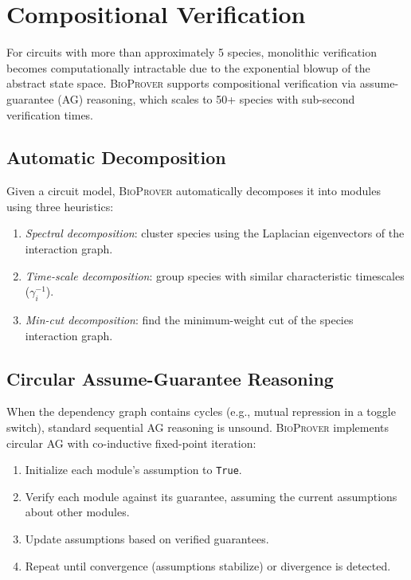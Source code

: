 \documentclass[11pt]{article}
\newcommand{\bioprover}{\textsc{BioProver}}
\begin{document}
\section{Compositional Verification}
\label{sec:compositional}

For circuits with more than approximately 5 species, monolithic
verification becomes computationally intractable due to the
exponential blowup of the abstract state space. \bioprover{} supports
compositional verification via assume-guarantee (AG) reasoning,
which scales to 50+ species with sub-second verification times.

\subsection{Automatic Decomposition}

Given a circuit model, \bioprover{} automatically decomposes it into
modules using three heuristics:
\begin{enumerate}[itemsep=1pt]
\item \emph{Spectral decomposition}: cluster species using the
  Laplacian eigenvectors of the interaction graph.
\item \emph{Time-scale decomposition}: group species with similar
  characteristic timescales ($\gamma_i^{-1}$).
\item \emph{Min-cut decomposition}: find the minimum-weight cut of
  the species interaction graph.
\end{enumerate}

\subsection{Circular Assume-Guarantee Reasoning}

When the dependency graph contains cycles (e.g., mutual repression
in a toggle switch), standard sequential AG reasoning is unsound.
\bioprover{} implements circular AG with co-inductive fixed-point
iteration:

\begin{enumerate}[itemsep=1pt]
\item Initialize each module's assumption to \texttt{True}.
\item Verify each module against its guarantee, assuming the current
  assumptions about other modules.
\item Update assumptions based on verified guarantees.
\item Repeat until convergence (assumptions stabilize) or divergence
  is detected.
\end{enumerate}
\end{document}
